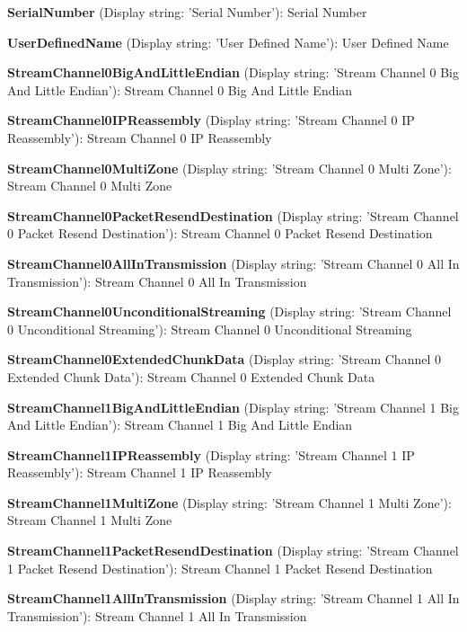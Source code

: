 \begin{DoxyItemize}
\item {\bfseries Serial\+Number} (Display string\+: 'Serial Number')\+: Serial Number
\item {\bfseries User\+Defined\+Name} (Display string\+: 'User Defined Name')\+: User Defined Name
\item {\bfseries Stream\+Channel0\+Big\+And\+Little\+Endian} (Display string\+: 'Stream Channel 0 Big And Little Endian')\+: Stream Channel 0 Big And Little Endian
\item {\bfseries Stream\+Channel0\+I\+P\+Reassembly} (Display string\+: 'Stream Channel 0 I\+P Reassembly')\+: Stream Channel 0 I\+P Reassembly
\item {\bfseries Stream\+Channel0\+Multi\+Zone} (Display string\+: 'Stream Channel 0 Multi Zone')\+: Stream Channel 0 Multi Zone
\item {\bfseries Stream\+Channel0\+Packet\+Resend\+Destination} (Display string\+: 'Stream Channel 0 Packet Resend Destination')\+: Stream Channel 0 Packet Resend Destination
\item {\bfseries Stream\+Channel0\+All\+In\+Transmission} (Display string\+: 'Stream Channel 0 All In Transmission')\+: Stream Channel 0 All In Transmission
\item {\bfseries Stream\+Channel0\+Unconditional\+Streaming} (Display string\+: 'Stream Channel 0 Unconditional Streaming')\+: Stream Channel 0 Unconditional Streaming
\item {\bfseries Stream\+Channel0\+Extended\+Chunk\+Data} (Display string\+: 'Stream Channel 0 Extended Chunk Data')\+: Stream Channel 0 Extended Chunk Data
\item {\bfseries Stream\+Channel1\+Big\+And\+Little\+Endian} (Display string\+: 'Stream Channel 1 Big And Little Endian')\+: Stream Channel 1 Big And Little Endian
\item {\bfseries Stream\+Channel1\+I\+P\+Reassembly} (Display string\+: 'Stream Channel 1 I\+P Reassembly')\+: Stream Channel 1 I\+P Reassembly
\item {\bfseries Stream\+Channel1\+Multi\+Zone} (Display string\+: 'Stream Channel 1 Multi Zone')\+: Stream Channel 1 Multi Zone
\item {\bfseries Stream\+Channel1\+Packet\+Resend\+Destination} (Display string\+: 'Stream Channel 1 Packet Resend Destination')\+: Stream Channel 1 Packet Resend Destination
\item {\bfseries Stream\+Channel1\+All\+In\+Transmission} (Display string\+: 'Stream Channel 1 All In Transmission')\+: Stream Channel 1 All In Transmission

\end{DoxyItemize}
